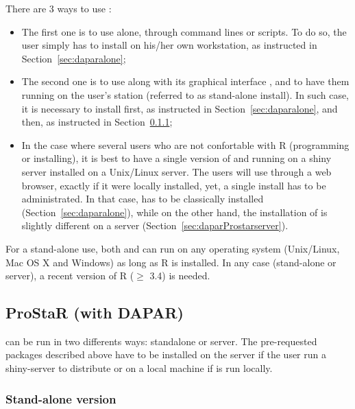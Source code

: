 \documentclass[12pt]{article}
\begin{document}
There are 3 ways to use :
\begin{itemize}
\item The first one is to use  alone, through command lines or 
scripts. To do so, the user simply has to install  on his/her 
own workstation, as instructed in Section~\ref{sec:daparalone};
\item The second one is to use  along with its graphical 
interface , and to have them running on the user's station 
(referred to as stand-alone install). In such case, it is necessary to install
 first, as instructed in Section~\ref{sec:daparalone}, and
 then, as instructed in 
Section~\ref{sec:daparProstarstandalone};
\item In the case where several  users who are not 
confortable with R (programming or installing), it is best to have a single 
version of  and  running on a shiny server 
installed on a Unix/Linux server. The users will use  through 
a web browser, exactly if it were locally installed, yet, a single install has 
to be administrated. In that case,  has to be classically 
installed (Section~\ref{sec:daparalone}), while on the other hand, the 
installation of  is slightly different on a server 
(Section~\ref{sec:daparProstarserver}).
\end{itemize}
For a stand-alone use, both  and  can run on 
any operating system (Unix/Linux, Mac OS X and Windows) as long as R is 
installed. 
In any case (stand-alone or server), a recent version of R ($\geq$ 3.4) is 
needed.


\subsection{ProStaR (with DAPAR)}\label{sec:daparProstar}

 can be run in two differents ways: standalone or server. The 
pre-requested packages described above have to be installed on the server if 
the user run a shiny-server to distribute  or on a local 
machine if  is run locally.



\subsubsection{Stand-alone version}\label{sec:daparProstarstandalone}
\end{document}

